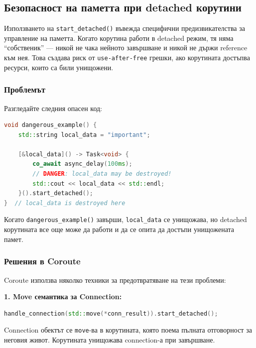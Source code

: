 \subsection{Безопасност на паметта при detached корутини}

Използването на \texttt{start\_detached()} въвежда специфични предизвикателства за управление на паметта. Когато корутина работи в detached режим, тя няма ``собственик'' --- никой не чака нейното завършване и никой не държи reference към нея. Това създава риск от \texttt{use-after-free} грешки, ако корутината достъпва ресурси, които са били унищожени.

\subsubsection{Проблемът}

Разгледайте следния опасен код:

\begin{lstlisting}[language=C++, basicstyle=\small\ttfamily, caption={Опасен pattern с detached корутина}]
void dangerous_example() {
    std::string local_data = "important";
    
    [&local_data]() -> Task<void> {
        co_await async_delay(100ms);
        // DANGER: local_data may be destroyed!
        std::cout << local_data << std::endl;
    }().start_detached();
}  // local_data is destroyed here
\end{lstlisting}

Когато \texttt{dangerous\_example()} завърши, \texttt{local\_data} се унищожава, но detached корутината все още може да работи и да се опита да достъпи унищожената памет.

\subsubsection{Решения в Coroute}

Coroute използва няколко техники за предотвратяване на тези проблеми:

\textbf{1. Move семантика за Connection:}
\begin{lstlisting}[language=C++, basicstyle=\small\ttfamily, caption={Безопасно предаване на ownership}]
handle_connection(std::move(*conn_result)).start_detached();
\end{lstlisting}

Connection обектът се \texttt{move}-ва в корутината, която поема пълната отговорност за неговия живот. Корутината унищожава connection-а при завършване.

